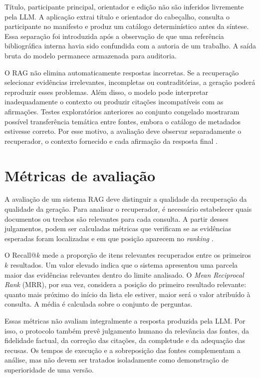 Título, participante principal, orientador e edição não são inferidos livremente pela LLM. A aplicação extrai título e orientador do cabeçalho, consulta o participante no manifesto e produz um catálogo determinístico antes da síntese. Essa separação foi introduzida após a observação de que uma referência bibliográfica interna havia sido confundida com a autoria de um trabalho. A saída bruta do modelo permanece armazenada para auditoria.

O RAG não elimina automaticamente respostas incorretas. Se a recuperação selecionar evidências irrelevantes, incompletas ou contraditórias, a geração poderá reproduzir esses problemas. Além disso, o modelo pode interpretar inadequadamente o contexto ou produzir citações incompatíveis com as afirmações. Testes exploratórios anteriores ao conjunto congelado mostraram possível transferência temática entre fontes, embora o catálogo de metadados estivesse correto. Por esse motivo, a avaliação deve observar separadamente o recuperador, o contexto fornecido e cada afirmação da resposta final \cite{gao2024survey}.

\section{Métricas de avaliação}

A avaliação de um sistema RAG deve distinguir a qualidade da recuperação da qualidade da geração. Para analisar o recuperador, é necessário estabelecer quais documentos ou trechos são relevantes para cada consulta. A partir desses julgamentos, podem ser calculadas métricas que verificam se as evidências esperadas foram localizadas e em que posição aparecem no \textit{ranking} \cite{manning2008ir}.

O Recall@$k$ mede a proporção de itens relevantes recuperados entre os primeiros $k$ resultados. Um valor elevado indica que o sistema apresentou uma parcela maior das evidências relevantes dentro do limite analisado. O \textit{Mean Reciprocal Rank} (MRR), por sua vez, considera a posição do primeiro resultado relevante: quanto mais próximo do início da lista ele estiver, maior será o valor atribuído à consulta. A média é calculada sobre o conjunto de perguntas.

Essas métricas não avaliam integralmente a resposta produzida pela LLM. Por isso, o protocolo também prevê julgamento humano da relevância das fontes, da fidelidade factual, da correção das citações, da completude e da adequação das recusas. Os tempos de execução e a sobreposição das fontes complementam a análise, mas não devem ser tratados isoladamente como demonstração de superioridade de uma versão.
